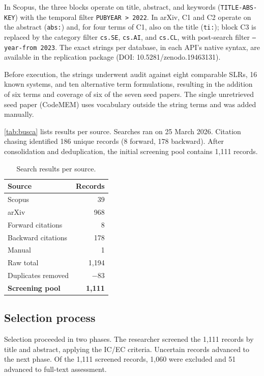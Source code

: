 In Scopus, the three blocks operate on title, abstract, and keywords
(\texttt{TITLE-ABS-KEY}) with the temporal filter
\texttt{PUBYEAR\,>\,2022}.
In arXiv, C1 and C2 operate on the abstract (\texttt{abs:}) and, for
four terms of C1, also on the title (\texttt{ti:}); block C3 is
replaced by the category filter \texttt{cs.SE}, \texttt{cs.AI}, and
\texttt{cs.CL}, with post-search filter \texttt{--year-from\,2023}.
The exact strings per database, in each API's native syntax, are
available in the replication package
(DOI: 10.5281/zenodo.19463131).

Before execution, the strings underwent audit against eight comparable
SLRs, 16 known systems, and ten alternative term formulations, resulting
in the addition of six terms and coverage of six of the seven seed
papers.
The single unretrieved seed paper (CodeMEM) uses vocabulary outside the
string terms and was added manually.

\autoref{tab:busca} lists results per source.
Searches ran on 25 March 2026.
Citation chasing identified 186 unique records (8 forward, 178 backward).
After consolidation and deduplication, the initial screening pool
contains 1,111 records.

\begin{table}[htbp]
  \centering
  \caption{Search results per source.}
  \label{tab:busca}
  \begin{tabular}{l r}
    \toprule
    Source & Records \\
    \midrule
    Scopus              &    39 \\
    arXiv               &   968 \\
    Forward citations   &     8 \\
    Backward citations  &   178 \\
    Manual              &     1 \\
    \midrule
    Raw total           & 1,194 \\
    Duplicates removed  & $-83$ \\
    \textbf{Screening pool} & \textbf{1,111} \\
    \bottomrule
  \end{tabular}
\end{table}

\subsection{Selection process}
\label{sec:selecao}

Selection proceeded in two phases.
The researcher screened the 1,111 records by title and abstract,
applying the IC/EC criteria.
Uncertain records advanced to the next phase.
Of the 1,111 screened records, 1,060 were excluded and 51 advanced to
full-text assessment.

